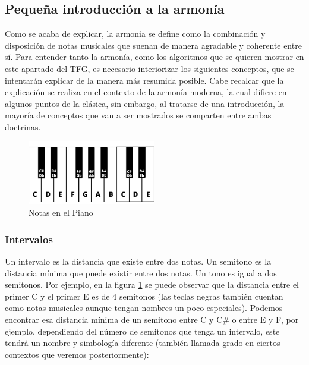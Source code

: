     \subsection{Pequeña introducción a la armonía}

        Como se acaba de explicar, la armonía se define como la combinación y disposición de notas musicales que suenan de manera agradable y coherente entre sí. Para entender tanto la armonía, como los algoritmos que se quieren mostrar en este apartado del TFG, es necesario interiorizar los siguientes conceptos, que se intentarán explicar de la manera más resumida posible. Cabe recalcar que la explicación se realiza en el contexto de la armonía moderna, la cual difiere en algunos puntos de la clásica, sin embargo, al tratarse de una introducción, la mayoría de conceptos que van a ser mostrados se comparten entre ambas doctrinas. 

\begin{figure}[h]
    \centering
    \includegraphics[width = 0.5\textwidth]{Imagenes/Bitmap/piano.png}
    \caption{Notas en el Piano}
    \label{fig:pianoImage}
\end{figure}

        \subsubsection{Intervalos}\label{sec:arm:intervalos}

        Un intervalo es la distancia que existe entre dos notas. Un semitono es la distancia mínima que puede existir entre dos notas. Un tono es igual a dos semitonos. Por ejemplo, en la figura \ref{fig:pianoImage} se puede observar que la distancia entre el primer C y el primer E es de 4 semitonos (las teclas negras también cuentan como notas musicales aunque tengan nombres un poco especiales). Podemos encontrar esa distancia mínima de un semitono entre C y C\# o entre E y F, por ejemplo. dependiendo del número de semitonos que tenga un intervalo, este tendrá un nombre y simbología diferente (también llamada grado en ciertos contextos que veremos posteriormente):

